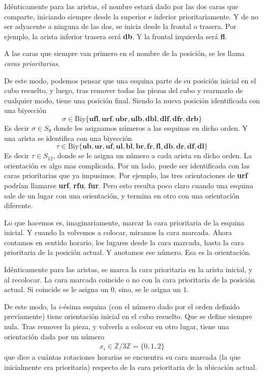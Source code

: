 \documentclass{article}
\theoremstyle{definition}
\newcommand{\Z}{\mathbb{Z}}
\renewcommand{\r}{\textbf{r}}
\renewcommand{\l}{\textbf{l}}
\renewcommand{\u}{\textbf{u}}
\renewcommand{\b}{\textbf{b}}
\newcommand{\f}{\textbf{f}}
\renewcommand{\d}{\textbf{d}}
\begin{document}
Idénticamente para las aristas, el nombre estará dado por las dos caras que comparte, iniciando siempre desde la superior e inferior prioritariamente. Y de no ser adyacente a ninguna de las dos, se inicia desde la frontal o trasera. Por ejemplo, la arista inferior trasera será \d\b. Y la frontal izquierda será \f\l.

A las caras que siempre van primero en el nombre de la posición, se les llama \textit{caras prioritarias}.

De este modo, podemos pensar que una esquina parte de su posición inicial en el cubo resuelto, y luego, tras remover todas las piezas del cubo y rearmarlo de cualquier modo, tiene una posición final. Siendo la nueva posición identificada con una biyección
\begin{equation}\label{eq:numeros_esquina}
    \sigma\in \text{Biy}\{\u\f\l,\u\r\f,\u\b\r,\u\l\b,\d\b\l,\d\l\f,\d\f\r,\d\r\b\}
\end{equation}
Es decir $\sigma\in S_{8}$ donde les asignamos números a las esquinas en dicho orden. Y una arista se identifica con una biyección
\begin{equation}\label{eq:numeros_arista}
    \tau\in \text{Biy}\{\u\b,\u\r,\u\f,\u\l,\b\l,\b\r,\f\r,\f\l,\d\b,\d\r,\d\f,\d\l\}
\end{equation}
Es decir $\tau\in S_{12}$, donde se le asigna un número a cada arista en dicho orden.
\bigskip
La orientación es algo mas complicada. Por un lado, puede ser identificada con las caras prioritarias que ya impusimos. Por ejemplo, las tres orientaciones de \u\r\f{} podrían llamarse \u\r\f, \r\f\u, \f\u\r. Pero esto resulta poco claro cuando una esquina sale de un lugar con una orientación, y termina en otro con una orientación diferente.

Lo que hacemos es, imaginariamente, marcar la cara prioritaria de la esquina inicial. Y cuando la volvemos a colocar, miramos la cara marcada. Ahora contamos en sentido horario, los lugares desde la cara marcada, hasta la cara prioritaria de la posición actual. Y anotamos ese número. Esa es la orientación.

Idénticamente para las aristas, se marca la cara prioritaria en la arista inicial, y al recolocar. La cara marcada coincide o no con la cara prioritaria de la posición actual. Si coincide se le asigna un $0$, sino, se le asigna un $1$.

De este modo, la $i$-ésima esquina (con el número dado por el orden definido previamente) tiene orientación inicial en el cubo resuelto. Que se define siempre nula. Tras remover la pieza, y volverla a colocar en otro lugar, tiene una orientación dada por un número
\begin{align*}
    x_i\in\Z/3\Z=\{0,1,2\}
\end{align*}
que dice a cuántas rotaciones horarias se encuentra su cara marcada (la que inicialmente era prioritaria) respecto de la cara prioritaria de la ubicación actual.
\end{document}
